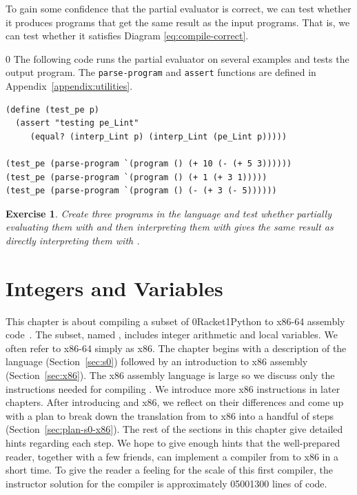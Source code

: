 \documentclass[7x10,nocrop]{TimesAPriori_MIT}%
\def\racketEd{0}
\def\pythonEd{1}
\def\edition{1}
\newcommand{\racket}[1]{{\if\edition\racketEd{#1}\fi}}
\newcommand{\python}[1]{{\if\edition\pythonEd #1\fi}}
\newtheorem{exercise}[theorem]{Exercise}
\begin{document}
To gain some confidence that the partial evaluator is correct, we can
test whether it produces programs that get the same result as the
input programs. That is, we can test whether it satisfies Diagram
\ref{eq:compile-correct}.
%
{\if\edition\racketEd
The following code runs the partial evaluator on several examples and
tests the output program.  The \texttt{parse-program} and
\texttt{assert} functions are defined in
Appendix~\ref{appendix:utilities}.\\
\begin{minipage}{1.0\textwidth}
\begin{lstlisting}
(define (test_pe p)
  (assert "testing pe_Lint"
     (equal? (interp_Lint p) (interp_Lint (pe_Lint p)))))

(test_pe (parse-program `(program () (+ 10 (- (+ 5 3))))))
(test_pe (parse-program `(program () (+ 1 (+ 3 1)))))
(test_pe (parse-program `(program () (- (+ 3 (- 5))))))
\end{lstlisting}
\end{minipage}
\fi}

\begin{exercise}\normalfont
  Create three programs in the \LangInt{} language and test whether
  partially evaluating them with  and then
  interpreting them with  gives the same result
  as directly interpreting them with .
\end{exercise}


\chapter{Integers and Variables}
\label{ch:Lvar}

This chapter is about compiling a subset of
\racket{Racket}\python{Python} to x86-64 assembly
code~\citep{Intel:2015aa}. The subset, named \LangVar{}, includes
integer arithmetic and local variables.  We often refer to x86-64
simply as x86.  The chapter begins with a description of the
\LangVar{} language (Section~\ref{sec:s0}) followed by an introduction
to x86 assembly (Section~\ref{sec:x86}). The x86 assembly language is
large so we discuss only the instructions needed for compiling
\LangVar{}. We introduce more x86 instructions in later chapters.
After introducing \LangVar{} and x86, we reflect on their differences
and come up with a plan to break down the translation from \LangVar{}
to x86 into a handful of steps (Section~\ref{sec:plan-s0-x86}).  The
rest of the sections in this chapter give detailed hints regarding
each step.  We hope to give enough hints that the well-prepared
reader, together with a few friends, can implement a compiler from
\LangVar{} to x86 in a short time.  To give the reader a feeling for
the scale of this first compiler, the instructor solution for the
\LangVar{} compiler is approximately \racket{500}\python{300} lines of
code.
\end{document}
